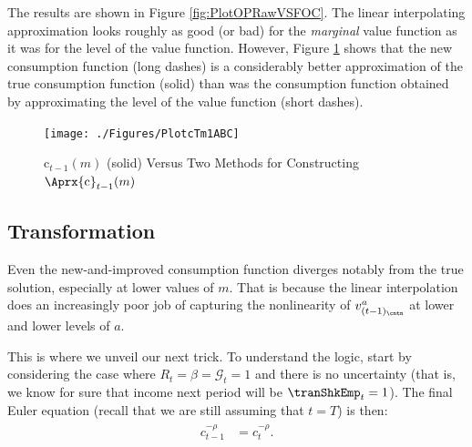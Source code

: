 \documentclass[titlepage, headings=optiontotocandhead]{econtex}
\begin{document}

The results are shown in Figure \ref{fig:PlotOPRawVSFOC}.  The linear interpolating approximation looks roughly as good (or bad) for the \textit{marginal} value function as it was for the level of the value function. However, Figure \ref{fig:PlotcTm1ABC} shows that the new consumption function (long dashes) is a considerably better approximation of the true consumption function (solid) than was the consumption function obtained by approximating the level of the value function (short dashes).

\hypertarget{PlotcTm1ABC}{}
\begin{figure}
  \centerline{\texttt{[image: ./Figures/PlotcTm1ABC]}}
  \caption{$\mathrm{c}_{t-1}(m)$ (solid) Versus Two Methods for Constructing $\Aprx{\mathrm{c}}_{t-1}(m)$}
  \label{fig:PlotcTm1ABC}
\end{figure}

\hypertarget{transformation}{}
\subsection{Transformation}\label{subsec:transformation}

Even the new-and-improved consumption function diverges notably from the true solution, especially at lower values of $m$.  That is because the linear interpolation does an increasingly poor job of capturing the nonlinearity of $v_{(t-1)_\cntn}^{a}$ at lower and lower levels of $a$.

This is where we unveil our next trick.  To understand the logic, start by considering the case where $R_{t} = \beta = \mathcal{G}_{t} = 1$ and there is no uncertainty (that is, we know for sure that income next period will be $\tranShkEmp_{t} = 1$).  The final Euler equation (recall that we are still assuming that $t=T$) is then:
\begin{equation}\begin{gathered}\begin{aligned}
      c_{t-1}^{-\rho}  & = c_{t}^{-\rho}.
    \end{aligned}\end{gathered}\end{equation}
\end{document}
